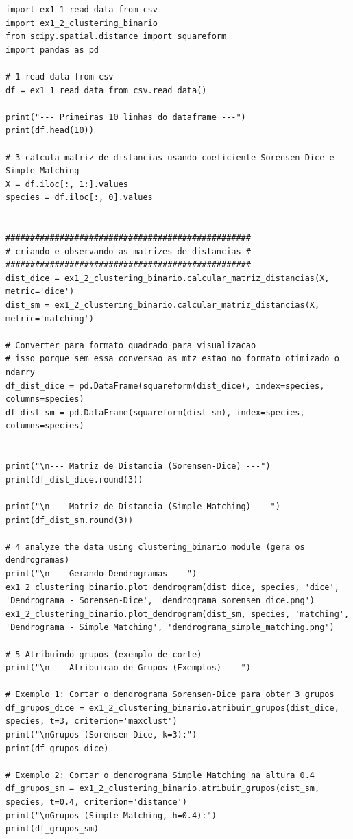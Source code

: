 \documentclass[11pt]{article}
\begin{document}
\begin{verbatim}
import ex1_1_read_data_from_csv
import ex1_2_clustering_binario
from scipy.spatial.distance import squareform
import pandas as pd

# 1 read data from csv
df = ex1_1_read_data_from_csv.read_data()

print("--- Primeiras 10 linhas do dataframe ---")
print(df.head(10))

# 3 calcula matriz de distancias usando coeficiente Sorensen-Dice e Simple Matching
X = df.iloc[:, 1:].values
species = df.iloc[:, 0].values


##################################################
# criando e observando as matrizes de distancias #
##################################################
dist_dice = ex1_2_clustering_binario.calcular_matriz_distancias(X, metric='dice')
dist_sm = ex1_2_clustering_binario.calcular_matriz_distancias(X, metric='matching')

# Converter para formato quadrado para visualizacao
# isso porque sem essa conversao as mtz estao no formato otimizado o ndarry
df_dist_dice = pd.DataFrame(squareform(dist_dice), index=species, columns=species)
df_dist_sm = pd.DataFrame(squareform(dist_sm), index=species, columns=species)


print("\n--- Matriz de Distancia (Sorensen-Dice) ---")
print(df_dist_dice.round(3))

print("\n--- Matriz de Distancia (Simple Matching) ---")
print(df_dist_sm.round(3))

# 4 analyze the data using clustering_binario module (gera os dendrogramas)
print("\n--- Gerando Dendrogramas ---")
ex1_2_clustering_binario.plot_dendrogram(dist_dice, species, 'dice', 'Dendrograma - Sorensen-Dice', 'dendrograma_sorensen_dice.png')
ex1_2_clustering_binario.plot_dendrogram(dist_sm, species, 'matching', 'Dendrograma - Simple Matching', 'dendrograma_simple_matching.png')

# 5 Atribuindo grupos (exemplo de corte)
print("\n--- Atribuicao de Grupos (Exemplos) ---")

# Exemplo 1: Cortar o dendrograma Sorensen-Dice para obter 3 grupos
df_grupos_dice = ex1_2_clustering_binario.atribuir_grupos(dist_dice, species, t=3, criterion='maxclust')
print("\nGrupos (Sorensen-Dice, k=3):")
print(df_grupos_dice)

# Exemplo 2: Cortar o dendrograma Simple Matching na altura 0.4
df_grupos_sm = ex1_2_clustering_binario.atribuir_grupos(dist_sm, species, t=0.4, criterion='distance')
print("\nGrupos (Simple Matching, h=0.4):")
print(df_grupos_sm)
\end{verbatim}
\end{document}

